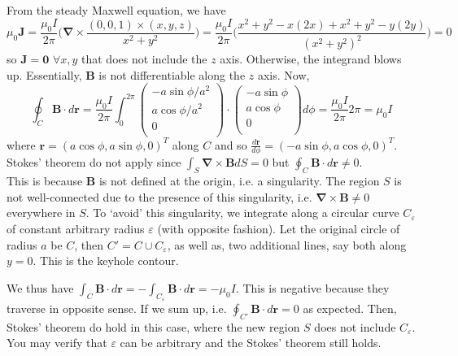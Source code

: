 \documentclass[a4paper]{article}
\begin{document}
\begin{ans}
From the steady Maxwell equation, we have
$$\mu_0\mathbf{J}=\frac{\mu_0I}{2\pi}\bigg(\boldsymbol{\nabla}\times\frac{(0,0,1)\times(x,y,z)}{x^2+y^2}\bigg)=\frac{\mu_0I}{2\pi}\bigg(\frac{x^2+y^2-x(2x)+x^2+y^2-y(2y)}{(x^2+y^2)^2}\bigg)=0$$
so $\mathbf{J}=\boldsymbol{0}$ $\forall x,y$ that does not include the $z$ axis. Otherwise, the integrand blows up. Essentially, $\mathbf{B}$ is not differentiable along the $z$ axis. Now,
$$\oint_C\mathbf{B}\cdot d\mathbf{r}=\frac{\mu_0I}{2\pi}\int_0^{2\pi}\begin{pmatrix}-a\sin\phi/a^2\\a\cos\phi/a^2\\0\\\end{pmatrix}\cdot\begin{pmatrix}-a\sin\phi\\a\cos\phi\\0\\\end{pmatrix}d\phi=\frac{\mu_0I}{2\pi}2\pi=\mu_0I$$
where $\mathbf{r}=(a\cos\phi,a\sin\phi,0)^T$ along $C$ and so $\frac{d\mathbf{r}}{d\phi}=(-a\sin\phi,a\cos\phi,0)^T$. Stokes' theorem do not apply since $\int_S\boldsymbol{\nabla}\times\mathbf{B}dS=0$ but $\oint_C\mathbf{B}\cdot d\mathbf{r}\neq0$.\\[5pt]
This is because $\mathbf{B}$ is not defined at the origin, i.e. a singularity. The region $S$ is not well-connected due to the presence of this singularity, i.e. $\boldsymbol{\nabla}\times\mathbf{B}\neq0$ everywhere in $S$.  To `avoid' this singularity, we integrate along a circular curve $C_\varepsilon$ of constant arbitrary radius $\varepsilon$ (with opposite fashion). Let the original circle of radius $a$ be $C$, then $C'=C\cup C_\varepsilon$, as well as, two additional lines, say both along $y=0$. This is the keyhole contour.
   \begin{center}
  \end{center}
We thus have $\int_{C}\mathbf{B}\cdot d\mathbf{r}=-\int_{C_\varepsilon}\mathbf{B}\cdot d\mathbf{r}=-\mu_0I$. This is negative because they traverse in opposite sense. If we sum up, i.e. $\oint_{C'}\mathbf{B}\cdot d\mathbf{r}=0$ as expected. Then, Stokes' theorem do hold in this case, where the new region $S$ does not include $C_\varepsilon$. You may verify that $\varepsilon$ can be arbitrary and the Stokes' theorem still holds.
\end{ans}
\end{document}
